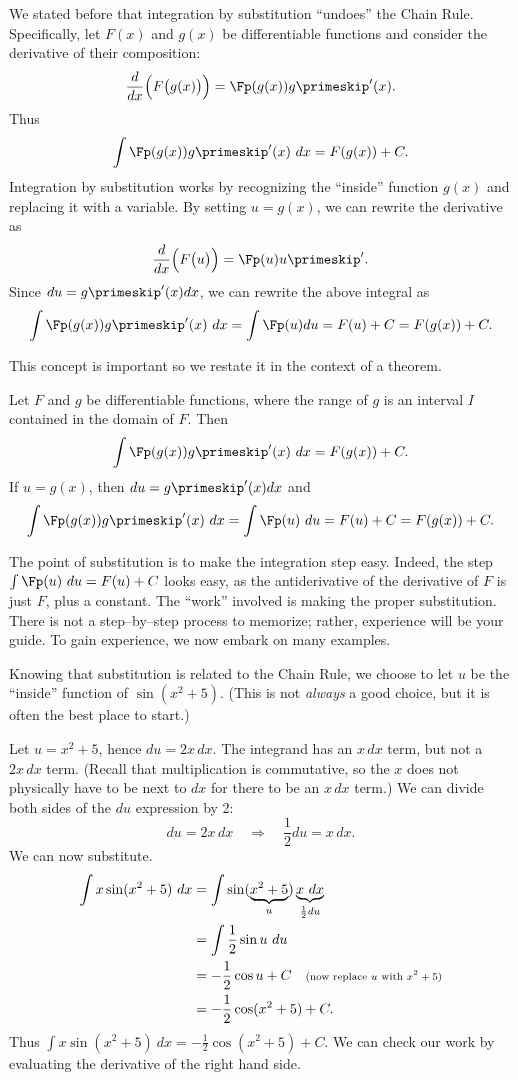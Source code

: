 We stated before that integration by substitution ``undoes'' the Chain Rule. Specifically, let $F(x)$ and $g(x)$ be differentiable functions and consider the derivative of their composition:
$$\frac{d}{dx}\Big(F\big(g(x)\big)\Big) = \Fp(g(x))g\primeskip'(x).$$ Thus 
$$\int \Fp(g(x))g\primeskip'(x)\ dx = F(g(x)) + C.$$
Integration by substitution works by recognizing the ``inside'' function $g(x)$ and replacing it with a variable. By setting $u=g(x)$, we can rewrite the derivative as
$$\frac{d}{dx}\Big(F\big(u\big)\Big) = \Fp(u)u\primeskip'.$$
Since $du = g\primeskip'(x)dx$, we can rewrite the above integral as
$$\int \Fp(g(x))g\primeskip'(x)\ dx = \int \Fp(u) du = F(u)+C = F(g(x))+ C.$$
	
This concept is important so we restate it in the context of a theorem.

{Let $F$ and $g$ be differentiable functions, where the range of $g$ is an interval $I$ contained in the domain of $F$. Then 
$$\int \Fp(g(x))g\primeskip'(x)\ dx = F(g(x)) + C.$$
If $u = g(x)$, then $du = g\primeskip'(x)dx$ and 
$$\int \Fp(g(x))g\primeskip'(x)\ dx = \int \Fp(u)\ du = F(u)+C = F(g(x))+C.$$}

The point of substitution is to make the integration step easy. Indeed, the step $\int \Fp(u)\ du = F(u) + C$ looks easy, as the antiderivative of the derivative of $F$ is just $F$, plus a constant. The ``work'' involved is making the proper substitution. There is not a step--by--step process to memorize; rather, experience will be your guide. To gain experience, we now embark on many examples.\\


{Knowing that substitution is related to the Chain Rule, we choose to let $u$ be the ``inside'' function of $\sin(x^2+5)$. (This is not \emph{always} a good choice, but it is often the best place to start.)

Let $u = x^2+5$, hence $du = 2x\,dx$. The integrand has an $x\,dx$ term, but not a $2x\,dx$ term. (Recall that multiplication is commutative, so the $x$ does not physically have to be next to $dx$ for there to be an $x\,dx$ term.) We can divide both sides of the $du$ expression by 2:
\[du = 2x\,dx \quad \Rightarrow \quad \frac12du = x\,dx.\]
We can now substitute.
\begin{align*}
	\int x\sin(x^2+5)\ dx
	&= \int \sin(\underbrace{x^2+5}_u) \underbrace{x\ dx}_{\frac12du}\\
	&= \int \frac12\sin u\ du \\
	&= -\frac12\cos u + C \quad \text{\scriptsize (now replace $u$ with $x^2+5$)}\\
	&=-\frac12\cos(x^2+5) + C.
\end{align*}
Thus $\int x\sin(x^2+5)\ dx = -\frac12\cos(x^2+5)+C$. We can check our work by evaluating the derivative of the right hand side.}

